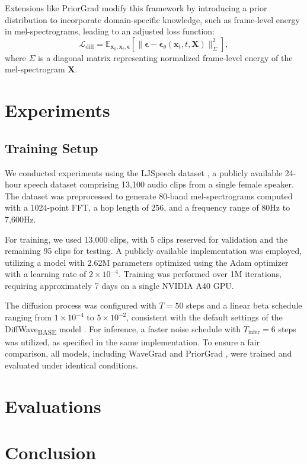 \documentclass[12pt,a4paper]{article}
\begin{document}
Extensions like PriorGrad modify this framework by introducing a prior
distribution to incorporate domain-specific knowledge, such as frame-level
energy in mel-spectrograms, leading to an adjusted loss function:
\begin{equation}
\mathcal{L}_{\text{diff}} = \mathbb{E}_{\mathbf{x}_0, \mathbf{x}_t, \boldsymbol{\epsilon}} \left[ \| \boldsymbol{\epsilon} - \boldsymbol{\epsilon}_\theta(\mathbf{x}_t, t, \mathbf{X}) \|_{\Sigma}^{2} \right],
\end{equation}
where $\Sigma$ is a diagonal matrix representing normalized frame-level energy
of the mel-spectrogram $\mathbf{X}$.



\newpage
\section {Experiments}

\subsection{Training Setup}
We conducted experiments using the LJSpeech dataset \cite{ito2017lj}, a publicly
available 24-hour speech dataset comprising 13,100 audio clips from a single
female speaker. The dataset was preprocessed to generate 80-band
mel-spectrograms computed with a 1024-point FFT, a hop length of 256, and a
frequency range of 80Hz to 7,600Hz. 

For training, we used 13,000 clips, with 5 clips reserved for validation and the
remaining 95 clips for testing. A publicly available implementation
\cite{kong2021diffwave} was employed, utilizing a model with 2.62M parameters
optimized using the Adam optimizer \cite{kingma2014adam} with a learning rate of
$2 \times 10^{-4}$. Training was performed over 1M iterations, requiring
approximately 7 days on a single NVIDIA A40 GPU.

The diffusion process was configured with $T = 50$ steps and a linear beta
schedule ranging from $1 \times 10^{-4}$ to $5 \times 10^{-2}$, consistent with
the default settings of the DiffWave\textsubscript{BASE} model
\cite{kong2021diffwave}. For inference, a faster noise schedule with
$T_{\text{infer}} = 6$ steps was utilized, as specified in the same
implementation. To ensure a fair comparison, all models, including WaveGrad
\cite{chen2020wavegrad} and PriorGrad \cite{chen2021priorgrad}, were trained and
evaluated under identical conditions.


\newpage
\section{Evaluations}

\newpage
\section{Conclusion}

\newpage
\nocite{*}



\end{document}
